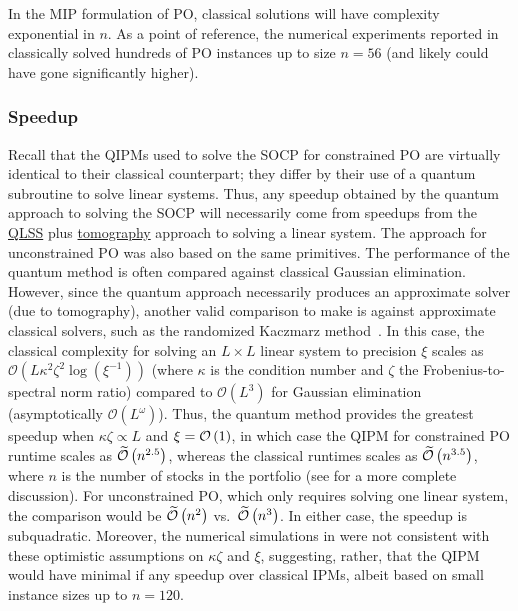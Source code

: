 \begin{refsection}
In the MIP formulation of PO, classical solutions will have complexity exponential in $n$. As a point of reference, the numerical experiments reported in \cite{chakrabarti2022universal} classically solved hundreds of PO instances up to size $n=56$ (and likely could have gone significantly higher).


\subsubsection*{Speedup}


Recall that the QIPMs used to solve the SOCP for constrained PO are virtually identical to their classical counterpart; they differ by their use of a quantum subroutine to solve linear systems. Thus, any speedup obtained by the quantum approach to solving the SOCP will necessarily come from speedups from the \hyperref[prim:QuantumLinearSystemSolvers]{QLSS} plus \hyperref[prim:Tomography]{tomography} approach to solving a linear system. The approach for unconstrained PO was also based on the same primitives. 
The performance of the quantum method is often compared against classical  Gaussian elimination. However, since the quantum approach necessarily produces an approximate solver (due to tomography), another valid comparison to make is against approximate classical solvers, such as the randomized Kaczmarz method~\cite{strohmer2009kaczmarz}. In this case, the classical complexity for solving an $L\times L$ linear system to precision $\xi$ scales as $\mathcal{O}(L\kappa^2 \zeta^2\log(\xi^{-1}))$ (where $\kappa$ is the condition number and $\zeta$ the Frobenius-to-spectral norm ratio) compared to $\mathcal{O}(L^3)$ for Gaussian elimination (asymptotically $\mathcal{O}(L^{\omega})$). Thus, the quantum method provides the greatest speedup when $\kappa\zeta\propto L$ and $\xi=\mathcal{O}\left( 1 \right)$, in which case the QIPM for constrained PO runtime scales as $\widetilde{\mathcal{O}}\left( n^{2.5} \right)$, whereas the classical runtimes scales as $\widetilde{\mathcal{O}}\left( n^{3.5} \right)$, where $n$ is the number of stocks in the portfolio (see \cite[Table XI]{dalzell2022socp} for a more complete discussion). For unconstrained PO, which only requires solving one linear system, the comparison would be $\widetilde{\mathcal{O}}\left( n^2 \right)$ vs.~$\widetilde{\mathcal{O}}\left( n^3 \right)$. In either case, the speedup is subquadratic. Moreover, the numerical simulations in \cite{dalzell2022socp} were not consistent with these optimistic assumptions on $\kappa \zeta$ and $\xi$, suggesting, rather, that the QIPM would have minimal if any speedup over classical IPMs, albeit based on small instance sizes up to $n=120$. 


\end{refsection}
